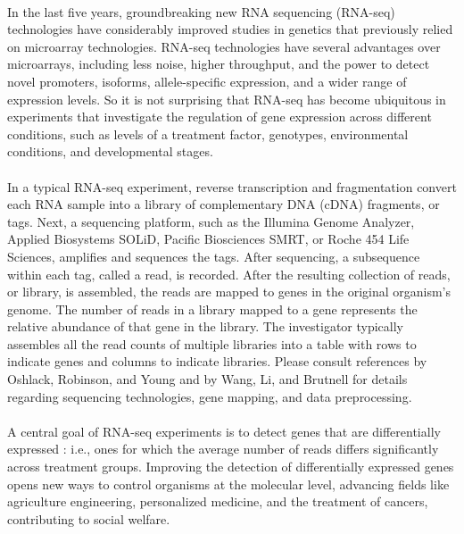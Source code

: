 \documentclass[10pt]{article}
\begin{document}
\paragraph{} \indent In the last five years, groundbreaking new RNA sequencing (RNA-seq) technologies have considerably improved studies in genetics that previously relied on microarray technologies. RNA-seq technologies have several advantages over microarrays, including less noise, higher throughput, and the power to detect novel promoters, isoforms, allele-specific expression, and a wider range of expression levels. So it is not surprising that RNA-seq has become ubiquitous in experiments that investigate the regulation of gene expression across different conditions, such as levels of a treatment factor, genotypes, environmental conditions, and developmental stages.

\paragraph{} \indent In a typical RNA-seq experiment, reverse transcription and fragmentation convert each RNA sample into a library of complementary DNA (cDNA) fragments, or tags. Next, a sequencing platform, such as the Illumina Genome Analyzer, Applied Biosystems SOLiD, Pacific Biosciences SMRT, or Roche 454 Life Sciences, amplifies and sequences the tags. After sequencing, a subsequence within each tag, called a read, is recorded. After the resulting collection of reads, or library, is assembled, the reads are mapped to genes in the original organism's genome. The number of reads in a library mapped to a gene represents the relative abundance of that gene in the library. The investigator typically assembles all the read counts of multiple libraries into a table with rows to indicate genes and columns to indicate libraries. Please consult references by Oshlack, Robinson, and Young \cite{oshlack} and by Wang, Li, and Brutnell \cite{wang} for details regarding sequencing technologies, gene mapping, and data preprocessing. %

\paragraph{} \indent A central goal of RNA-seq experiments is to detect genes that are differentially expressed %
: i.e., ones for which the average number of reads differs significantly across treatment groups. Improving the detection of differentially expressed genes opens new ways to control organisms at the molecular level, advancing fields like agriculture engineering, personalized medicine, and the treatment of cancers, contributing to social welfare.
\end{document}
